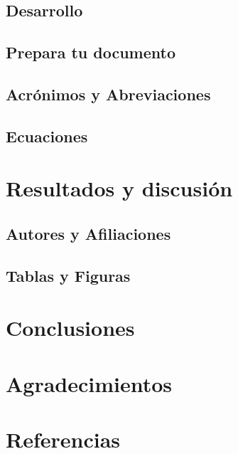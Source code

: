     \subsection{Desarrollo}
    
    
    \subsection{Prepara tu documento}
    
    
    \subsection{Acrónimos y Abreviaciones}
    
    
    \subsection{Ecuaciones}
    
    \section{Resultados y discusión}
    
    
    \subsection{Autores y Afiliaciones}
    
    \subsection{Tablas y Figuras}
    
    \section{Conclusiones}
    
    
    
    \section{Agradecimientos}
    
    
    \section{Referencias}
    
    
    
